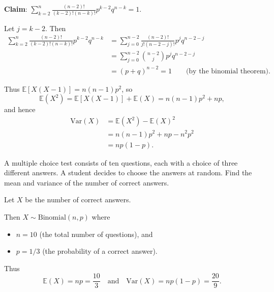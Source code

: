 \documentclass[lecture]{csm}
\newcommand{\expe}{\mathbb{E}}
\newcommand{\var}{\text{Var}}
\def\it{\item}
\def\bit{\begin{itemize}}
\def\eit{\end{itemize}}
\begin{document}
\textbf{Claim}: $\displaystyle\sum_{k=2}^{n}\frac{(n-2)!}{(k-2)!(n-k)!} p^{k-2} q^{n-k} = 1$.

\vspace*{2ex}
Let $j=k-2$. Then
\begin{align*}
\sum_{k=2}^{n}\frac{(n-2)!}{(k-2)!(n-k)!} p^{k-2} q^{n-k} 
	& = \sum_{j=0}^{n-2}\frac{(n-2)!}{j!(n-2-j)!} p^{j} q^{n-2-j} \\
	& = \sum_{j=0}^{n-2}\binom{n-2}{j} p^{j} q^{n-2-j} \\
	& = (p+q)^{n-2} = 1\qquad\text{(by the binomial theorem).}
\end{align*}

Thus $\expe[X(X - 1)]=n(n-1)p^2$, so
\[
\expe(X^2) 
	= \expe[X(X-1)] + \expe(X)
	= n(n-1)p^2 + np,
\]
and hence
\begin{align*}
\var(X)	
	& = \expe(X^2)-\expe(X)^2 \\
	& = n(n-1)p^2 + np - n^2p^2 \\
	& = np(1-p).
\end{align*}

\break %

\begin{example}
A multiple choice test consists of ten questions, each with a choice of three different answers. A student decides to choose the answers at random. Find the mean and variance of the number of correct answers.
\end{example}

\begin{solution}
Let $X$ be the number of correct answers.\par
Then $X\sim\text{Binomial}(n,p)$ where
\bit
\it $n=10$  (the total number of questions), and
\it $p=1/3$ (the probability of a correct answer).
\eit
Thus
\[
\expe(X)=np=\frac{10}{3}\quad\text{and}\quad \var(X)=np(1-p)=\frac{20}{9}.
\]
\end{solution}

\end{document}
